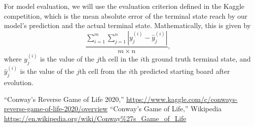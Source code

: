 \documentclass[conference]{IEEEtran}
\begin{document}
For model evaluation, we will use the evaluation criterion defined in the Kaggle competition, which is the mean absolute error of the terminal state reach by our model's prediction and the actual terminal state. Mathematically, this is given by $$\frac{\sum_{i=1}^{m}\sum_{j=1}^{n}|y_{j}^{(i)} - \hat y_{j}^{(i)}|}{m \times n},$$ where $y_{j}^{(i)}$ is the value of the $j$th cell in the $i$th ground truth terminal state, and $\hat y_{j}^{(i)}$ is the value of the $j$th cell from the $i$th predicted starting board after evolution.


\begin{thebibliography}{00}
 ``Conway's Reverse Game of Life 2020,'' \url{https://www.kaggle.com/c/conways-reverse-game-of-life-2020/overview}
 ``Conway's Game of Life,'' Wikipedia \url{https://en.wikipedia.org/wiki/Conway\%27s_Game_of_Life}
\end{thebibliography}
\end{document}
